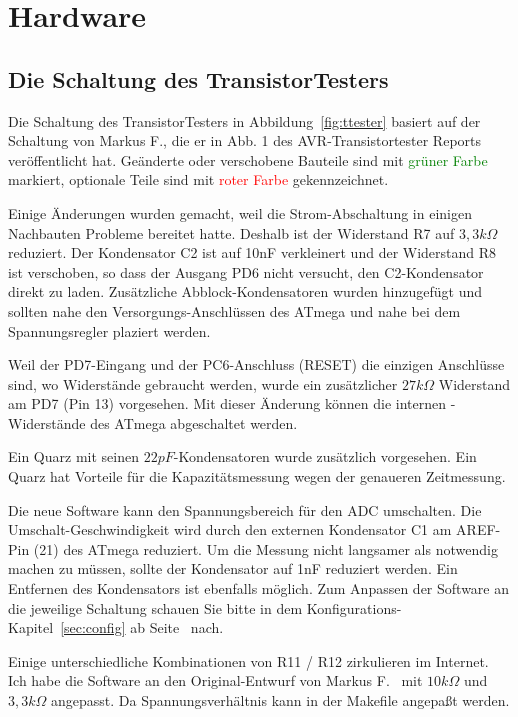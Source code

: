 \chapter{Hardware}

\section{Die Schaltung des TransistorTesters}
\label{sec:hardware}
Die Schaltung des TransistorTesters in Abbildung~\ref{fig:ttester} basiert auf der Schaltung von
Markus F., die er in Abb. 1 des AVR-Transistortester Reports~\cite{Frejek} veröffentlicht hat.
Geänderte oder verschobene Bauteile sind mit \textcolor{green}{grüner Farbe} markiert, optionale Teile sind
mit \textcolor{red}{roter Farbe} gekennzeichnet.

Einige Änderungen wurden gemacht, weil die Strom-Abschaltung in einigen Nachbauten Probleme
bereitet hatte.
Deshalb ist der Widerstand R7 auf \(3,3k\Omega\) reduziert. 
Der Kondensator C2 ist auf 10nF verkleinert und der Widerstand R8 ist verschoben, so dass der
Ausgang PD6 nicht versucht, den C2-Kondensator direkt zu laden.
Zusätzliche Abblock-Kondensatoren wurden hinzugefügt und sollten nahe den Versorgungs-Anschlüssen
des ATmega und nahe bei dem Spannungsregler plaziert werden.

Weil der PD7-Eingang und der PC6-Anschluss (RESET) die einzigen Anschlüsse sind, wo
 Widerstände gebraucht werden, wurde ein zusätzlicher \(27k\Omega\) Widerstand am PD7 (Pin 13) vorgesehen.
Mit dieser Änderung können die internen -Widerstände des ATmega abgeschaltet werden.

Ein Quarz mit seinen \(22pF\)-Kondensatoren wurde zusätzlich vorgesehen.
Ein Quarz hat Vorteile für die Kapazitätsmessung wegen der genaueren Zeitmessung.

Die neue Software kann den Spannungsbereich für den ADC umschalten. Die Um\-schalt-Ge\-schwin\-dig\-keit
wird durch den externen Kondensator C1 am AREF-Pin (21) des ATmega reduziert.
Um die Messung nicht langsamer als notwendig machen zu müssen, sollte der Kondensator auf
1nF reduziert werden. Ein Entfernen des Kondensators ist ebenfalls möglich.
Zum Anpassen der Software an die jeweilige Schaltung schauen Sie bitte in dem
Kon\-fi\-gura\-tions-Kapitel~\ref{sec:config} ab Seite~\pageref{sec:config} nach. 

Einige unterschiedliche Kombinationen von R11 / R12 zirkulieren im Internet.
Ich habe die Software an den Original-Entwurf von Markus F.~\cite{Frejek} mit \(10k\Omega\) und \(3,3k\Omega\) angepasst.
Da Spannungsverhältnis kann in der Makefile angepaßt werden.

